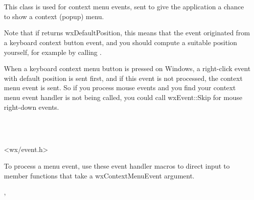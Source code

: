 \section{}\label{wxcontextmenuevent}

This class is used for context menu events, sent to give the application a chance to show a context (popup) menu.

Note that if  returns wxDefaultPosition, this means that the event originated
from a keyboard context button event, and you should compute a suitable position yourself,
for example by calling .

When a keyboard context menu button is pressed on Windows, a right-click event with default position is sent first,
and if this event is not processed, the context menu event is sent. So if you process mouse events and you find your context menu event handler
is not being called, you could call wxEvent::Skip for mouse right-down events.


\\
\\


<wx/event.h>


To process a menu event, use these event handler macros to direct input to member
functions that take a wxContextMenuEvent argument.

\twocolwidtha{7cm}
\begin{twocollist}\itemsep=0pt
\end{twocollist}


,\\


\label{wxcontextmenueventctor}


